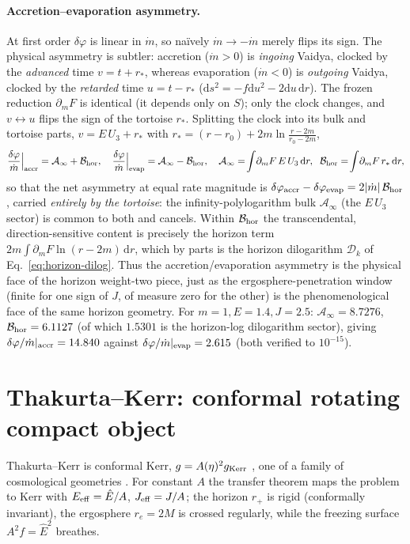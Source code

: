 \documentclass[12pt]{iopart}
\newcommand{\Ehat}{\hat E}
\newcommand{\rp}{r_{+}}
\newcommand{\re}{r_{e}}
\newcommand{\dd}{\mathrm{d}}
\begin{document}
\paragraph{Accretion--evaporation asymmetry.} At first order $\delta\varphi$ is
linear in $\dot m$, so na\"ively $\dot m\to-\dot m$ merely flips its sign. The
physical asymmetry is subtler: accretion ($\dot m>0$) is \emph{ingoing} Vaidya,
clocked by the \emph{advanced} time $v=t+r_*$, whereas evaporation ($\dot m<0$) is
\emph{outgoing} Vaidya, clocked by the \emph{retarded} time $u=t-r_*$
($\dd s^2=-f\dd u^2-2\dd u\,\dd r$). The frozen reduction $\partial_m F$ is identical
(it depends only on $S$); only the clock changes, and $v\leftrightarrow u$ flips the
sign of the tortoise $r_*$. Splitting the clock into its bulk and tortoise parts,
$v=E\,U_3+r_*$ with $r_*=(r-r_0)+2m\ln\!\frac{r-2m}{r_0-2m}$,
\begin{equation}
    \frac{\delta\varphi}{\dot m}\Big|_{\rm accr}=\mathcal{A}_\infty+\mathcal{B}_{\rm hor},
    \quad
    \frac{\delta\varphi}{\dot m}\Big|_{\rm evap}=\mathcal{A}_\infty-\mathcal{B}_{\rm hor},
    \quad
    \mathcal{A}_\infty=\!\int\!\partial_m F\,E\,U_3\,\dd r,\;\;
    \mathcal{B}_{\rm hor}=\!\int\!\partial_m F\,r_*\,\dd r,
    \label{eq:vaidya-asymmetry}
\end{equation}
so that the net asymmetry at equal rate magnitude is
$\delta\varphi_{\rm accr}-\delta\varphi_{\rm evap}=2|\dot m|\,\mathcal{B}_{\rm hor}$,
carried \emph{entirely by the tortoise}: the infinity-polylogarithm bulk
$\mathcal{A}_\infty$ (the $E\,U_3$ sector) is common to both and cancels. Within
$\mathcal{B}_{\rm hor}$ the transcendental, direction-sensitive content is precisely
the horizon term $2m\!\int\!\partial_m F\ln(r-2m)\,\dd r$, which by parts is the
horizon dilogarithm $\mathcal{D}_k$ of Eq.~\eqref{eq:horizon-dilog}. Thus the
accretion/evaporation asymmetry is the physical face of the horizon weight-two piece,
just as the ergosphere-penetration window (finite for one sign of $J$, of measure zero
for the other) is the phenomenological face of the same horizon geometry. For
$m=1,E=1.4,J=2.5$: $\mathcal{A}_\infty=8.7276$, $\mathcal{B}_{\rm hor}=6.1127$ (of which
$1.5301$ is the horizon-log dilogarithm sector), giving
$\delta\varphi/\dot m|_{\rm accr}=14.840$ against
$\delta\varphi/\dot m|_{\rm evap}=2.615$ (both verified to $10^{-15}$).


\section{Thakurta--Kerr: conformal rotating compact object}
\label{sec:thakurta}
Thakurta--Kerr is conformal Kerr, $g=A(\eta)^2 g_{\rm Kerr}$
\cite{Thakurta1981,Kerr1963}, one of a family of cosmological geometries
\cite{McVittie1933,SultanaDyer2005,Kaloper2010,NolanMcVittie1998,MelloMaciel2017,FaraoniBook}.
For constant $A$
the transfer theorem maps the problem to Kerr with $E_{\rm eff}=\Ehat/A$,
$J_{\rm eff}=J/A$; the horizon $\rp$ is rigid (conformally invariant), the
ergosphere $\re=2M$ is crossed regularly, while the freezing surface
$A^2 f=\Ehat^2$ breathes.
\end{document}

